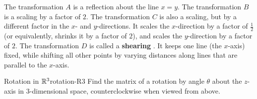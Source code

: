 \begin{solution}
\begin{center}
  \end{center}
  The transformation $A$ is a reflection%
   about the line $x=y$. The
  transformation $B$ is a scaling%
   by a factor of $2$. The
  transformation $C$ is also a scaling, but by a different factor in
  the $x$- and $y$-directions. It scales the $x$-direction by a factor
  of $\frac{1}{2}$ (or equivalently, shrinks it by a factor of $2$),
  and scales the $y$-direction by a factor of $2$. The transformation
  $D$ is called a \textbf{shearing}%
  . It keeps one line (the
  $x$-axis) fixed, while shifting all other points by varying
  distances along lines that are parallel to the $x$-axis.
\end{solution}

\begin{example}{Rotation in $\mathbb{R}^3$}{rotation-R3}
  Find the matrix of a rotation%
   by angle $\theta$ about the
  $z$-axis in $3$-dimensional space, counterclockwise when viewed from
  above.
\end{example}

